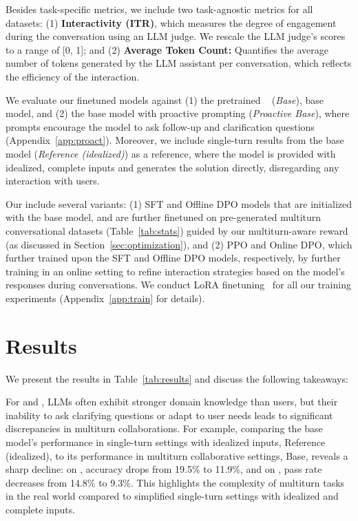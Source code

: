 Besides task-specific metrics, we include two task-agnostic metrics for all datasets: (1) \textbf{{Interactivity (ITR)}}, which measures the degree of engagement during the conversation using an LLM judge. We rescale the LLM judge's scores to a range of [0, 1]; and (2) \textbf{{Average Token Count}:} Quantifies the average number of tokens generated by the LLM assistant per conversation, which reflects the efficiency of the interaction.




 We evaluate our finetuned models against (1) the pretrained \llama~\citep{metallama} (\textit{Base}), \ie base model, and (2) the base model with proactive prompting (\textit{Proactive Base}), where prompts encourage the model to ask follow-up and clarification questions (\cf Appendix~\ref{app:proact}). Moreover, we include single-turn results from the base model (\ie \textit{Reference (idealized)}) as a reference, where the model is provided with idealized, complete inputs and generates the solution directly, disregarding any interaction with users. 

 Our \objects include several variants: (1) SFT and Offline DPO models that are initialized with the \llama base model, and are further finetuned on pre-generated multiturn conversational datasets (Table~\ref{tab:stats}) guided by our multiturn-aware reward (as discussed in Section~\ref{sec:optimization}), and (2) PPO and Online DPO, which further trained upon the SFT and Offline DPO models, respectively, by further training in an online setting to refine interaction strategies based on the model's responses during conversations. We conduct LoRA finetuning~\citep{lora} for all our training experiments (\cf Appendix~\ref{app:train} for details).

\section{Results}
\label{sec:quantitative}

We present the results in Table~\ref{tab:results} and discuss the following takeaways:

For \mathct and \codet, LLMs often exhibit stronger domain knowledge than users, but their inability to ask clarifying questions or adapt to user needs leads to significant discrepancies in multiturn collaborations. For example, comparing the base model's performance in single-turn settings with idealized inputs, \ie Reference (idealized), to its performance in multiturn collaborative settings, \ie Base, reveals a sharp decline: on \mathct, accuracy drops from 19.5\% to 11.9\%, and on \codet, pass rate decreases from 14.8\% to 9.3\%.
This highlights the complexity of multiturn tasks in the real world compared to simplified single-turn settings with idealized and complete inputs.

